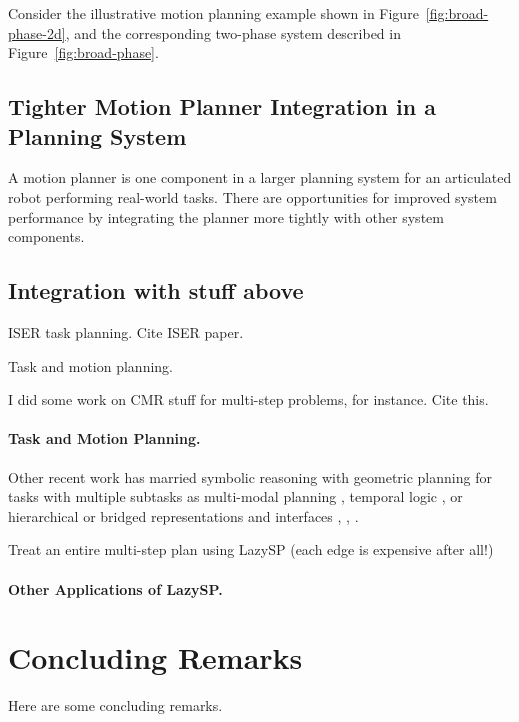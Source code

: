 Consider the illustrative motion planning example shown
in Figure~\ref{fig:broad-phase-2d},
and the corresponding two-phase system described
in Figure~\ref{fig:broad-phase}.


\subsection{Tighter Motion Planner Integration in a Planning System}

A motion planner is one component in a larger planning system for
an articulated robot performing real-world tasks.
There are opportunities for improved system performance by
integrating the planner more tightly with other system components.

\subsection{Integration with stuff above}

ISER task planning.
Cite ISER paper.

Task and motion planning.

I did some work on CMR stuff for multi-step problems,
for instance.
Cite this.

\paragraph{Task and Motion Planning.}
Other recent work has married symbolic reasoning with geometric planning
for tasks with multiple subtasks
as multi-modal planning \citep{hauser2010multi},
temporal logic \citep{bhatia2010temporalgoals},
or hierarchical or bridged representations and interfaces
\citep{cambon2009hybrid}, \citep{gravot2005asymov},
\citep{srivastava2014taskmotion}.

Treat an entire multi-step plan using LazySP (each edge is expensive after all!)

\paragraph{Other Applications of LazySP.}

\section{Concluding Remarks}
\label{sec:conclusion:remarks}

Here are some concluding remarks.
